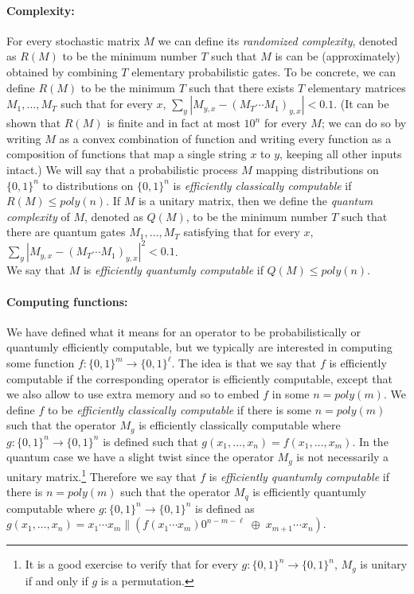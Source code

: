 \paragraph{Complexity:} For every stochastic matrix \(M\) we can define
its \emph{randomized complexity}, denoted as \(R(M)\) to be the minimum
number \(T\) such that \(M\) is can be (approximately) obtained by
combining \(T\) elementary probabilistic gates. To be concrete, we can
define \(R(M)\) to be the minimum \(T\) such that there exists \(T\)
elementary matrices \(M_1,\ldots,M_T\) such that for every \(x\),
\(\sum_y |M_{y,x}-(M_T\cdots M_1)_{y,x}|<0.1\). (It can be shown that
\(R(M)\) is finite and in fact at most \(10^n\) for every \(M\); we can
do so by writing \(M\) as a convex combination of function and writing
every function as a composition of functions that map a single string
\(x\) to \(y\), keeping all other inputs intact.) We will say that a
probabilistic process \(M\) mapping distributions on \(\{0,1\}^n\) to
distributions on \(\{0,1\}^n\) is \emph{efficiently classically
computable} if \(R(M) \leq poly(n)\). If \(M\) is a unitary matrix, then
we define the \emph{quantum complexity} of \(M\), denoted as \(Q(M)\),
to be the minimum number \(T\) such that there are quantum gates
\(M_1,\ldots,M_T\) satisfying that for every \(x\),
\(\sum_y |M_{y,x}-(M_T \cdots M_1)_{y,x}|^2 < 0.1\).\\
We say that \(M\) is \emph{efficiently quantumly computable} if
\(Q(M)\leq poly(n)\).

\paragraph{Computing functions:} We have defined what it means for an
operator to be probabilistically or quantumly efficiently computable,
but we typically are interested in computing some function
\(f:\{0,1\}^m\rightarrow\{0,1\}^\ell\). The idea is that we say that
\(f\) is efficiently computable if the corresponding operator is
efficiently computable, except that we also allow to use extra memory
and so to embed \(f\) in some \(n=poly(m)\). We define \(f\) to be
\emph{efficiently classically computable} if there is some \(n=poly(m)\)
such that the operator \(M_g\) is efficiently classically computable
where \(g:\{0,1\}^n\rightarrow\{0,1\}^n\) is defined such that
\(g(x_1,\ldots,x_n)=f(x_1,\ldots,x_m)\). In the quantum case we have a
slight twist since the operator \(M_g\) is not necessarily a unitary
matrix.\footnote{It is a good exercise to verify that for every
  \(g:\{0,1\}^n\rightarrow\{0,1\}^n\), \(M_g\) is unitary if and only if
  \(g\) is a permutation.} Therefore we say that \(f\) is
\emph{efficiently quantumly computable} if there is \(n=poly(m)\) such
that the operator \(M_q\) is efficiently quantumly computable where
\(g:\{0,1\}^n\rightarrow\{0,1\}^n\) is defined as
\(g(x_1,\ldots,x_n) = x_1\cdots x_m \|( f(x_1\cdots x_m)0^{n-m-\ell}\; \oplus \; x_{m+1}\cdots x_n)\).

